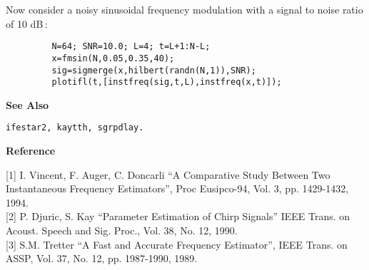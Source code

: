 \begin{minipage}[t]{13.5cm}
Now consider a noisy sinusoidal frequency modulation with a signal to noise
ratio of 10 dB\,:
\begin{verbatim}
         N=64; SNR=10.0; L=4; t=L+1:N-L; 
         x=fmsin(N,0.05,0.35,40);
         sig=sigmerge(x,hilbert(randn(N,1)),SNR);
         plotifl(t,[instfreq(sig,t,L),instfreq(x,t)]); 
\end{verbatim}
\end{minipage}
\vspace*{.5cm}


{\bf \large \sf See Also}\\
\hspace*{1.5cm}
\begin{minipage}[t]{13.5cm}
\begin{verbatim}
ifestar2, kaytth, sgrpdlay.
\end{verbatim}
\end{minipage}
\vspace*{.5cm}


{\bf \large \sf Reference}\\
\hspace*{1.5cm}
\begin{minipage}[t]{13.5cm}
[1] I. Vincent, F. Auger, C. Doncarli ``A Comparative Study Between Two
Instantaneous Frequency Estimators'', Proc Eusipco-94, Vol. 3,
pp. 1429-1432, 1994.\\

[2] P. Djuric, S. Kay ``Parameter Estimation of Chirp Signals''
IEEE Trans. on Acoust. Speech and Sig. Proc., Vol. 38, No. 12, 1990.\\

[3] S.M. Tretter ``A Fast and Accurate Frequency Estimator'', IEEE
Trans. on ASSP, Vol. 37, No. 12, pp. 1987-1990, 1989.

\end{minipage}




